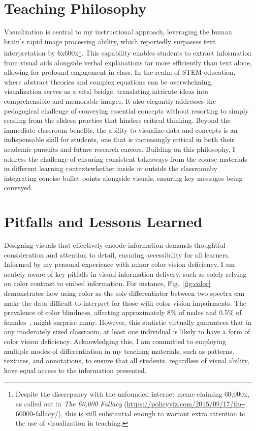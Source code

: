 \section{Teaching Philosophy}
Visualization is central to my instructional approach, leveraging the human brain's rapid image processing ability, which reportedly surpasses text interpretation by 6x\textendash 600x\footnote{
    Despite the discrepancy with the unfounded internet meme claiming 60,000x, as called out in \emph{The 60,000 Fallacy} (\url{https://policyviz.com/2015/09/17/the-60000-fallacy/}), this is still substantial enough to warrant extra attention to the use of visualization in teaching.
}.
This capability enables students to extract information from visual aids alongside verbal explanations far more efficiently than text alone, allowing for profound engagement in class. In the realm of STEM education, where abstract theories and complex equations can be overwhelming, visualization serves as a vital bridge, translating intricate ideas into comprehensible and memorable images. It also elegantly addresses the pedagogical challenge of conveying essential concepts without resorting to simply reading from the slides\textemdash a practice that hinders critical thinking. Beyond the immediate classroom benefits, the ability to visualize data and concepts is an indispensable skill for students, one that is increasingly critical in both their academic pursuits and future research careers. Building on this philosophy, I address the challenge of ensuring consistent takeaways from the course materials in different learning contexts\textemdash whether inside or outside the classroom\textemdash by integrating concise bullet points alongside visuals, ensuring key messages being conveyed.

\section{Pitfalls and Lessons Learned}
Designing visuals that effectively encode information demands thoughtful consideration and attention to detail, ensuring accessibility for all learners. Informed by my personal experience with minor color vision deficiency, I am acutely aware of key pitfalls in visual information delivery, such as solely relying on color contrast to embed information. For instance, Fig.~\ref{fig:color} demonstrates how using color as the sole differentiator between two spectra can make the data difficult to interpret for those with color vision impairments. The prevalence of color blindness, affecting approximately 8\% of males and 0.5\% of females~\cite{TypesColourBlindness}, might surprise many. However, this statistic virtually guarantees that in any moderately sized classroom, at least one individual is likely to have a form of color vision deficiency. Acknowledging this, I am committed to employing multiple modes of differentiation in my teaching materials, such as patterns, textures, and annotations, to ensure that all students, regardless of visual ability, have equal access to the information presented.

